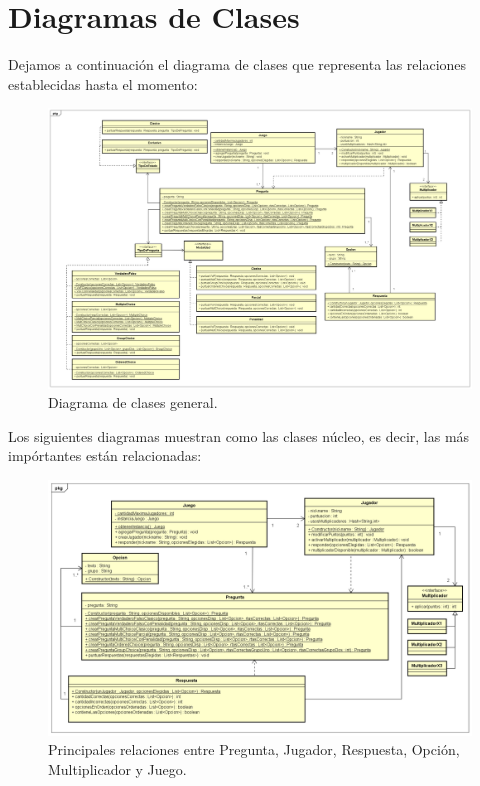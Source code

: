 \documentclass[titlepage,a4paper]{article}
\begin{document}
\section{Diagramas de Clases}\label{sec:diagramasdeclase}

Dejamos a continuación el diagrama de clases que representa las relaciones establecidas hasta el momento:

\begin{figure}[H]
\centering
\includegraphics[width=1\textwidth]{img/UMLClases1.png}
\caption{\label{fig:class01}Diagrama de clases general.}
\end{figure}

\newpage
Los siguientes diagramas muestran como las clases núcleo, es decir, las más impórtantes están relacionadas:

\begin{figure}[H]
\centering
\includegraphics[width=1\textwidth]{img/UMLClases2.png}
\caption{\label{fig:class01}Principales relaciones entre Pregunta, Jugador, Respuesta, Opción, Multiplicador y Juego.}
\end{figure}
\end{document}
